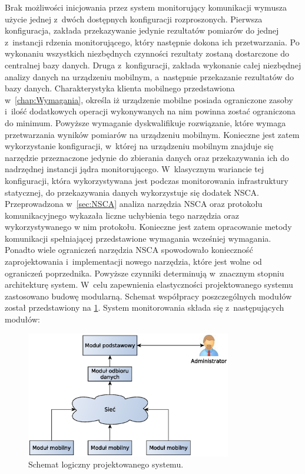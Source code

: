 Brak możliwości inicjowania przez system monitorujący komunikacji
wymusza użycie jednej z~dwóch dostępnych konfiguracji
rozproszonych. Pierwsza konfiguracja, zakłada przekazywanie jedynie
rezultatów pomiarów do jednej z~instancji rdzenia monitorującego,
który następnie dokona ich przetwarzania. Po wykonaniu wszystkich
niezbędnych czynności rezultaty zostaną dostarczone do centralnej bazy
danych. Druga z~konfiguracji, zakłada wykonanie całej niezbędnej
analizy danych na urządzeniu mobilnym, a~następnie przekazanie
rezultatów do bazy danych. Charakterystyka klienta mobilnego
przedstawiona w~\ref{chap:Wymagania}, określa iż urządzenie mobilne
posiada ograniczone zasoby i~ilość dodatkowych operacji wykonywanych
na nim powinna zostać ograniczona do minimum. Powyższe wymaganie
dyskwalifikuje rozwiązanie, które wymaga przetwarzania wyników
pomiarów na urządzeniu mobilnym. Konieczne jest zatem wykorzystanie
konfiguracji, w~której na urządzeniu mobilnym znajduje się narzędzie
przeznaczone jedynie do zbierania danych oraz przekazywania ich do
nadrzędnej instancji jądra monitorującego. W~klasycznym wariancie tej
konfiguracji, która wykorzystywana jest podczas monitorowania
infrastruktury statycznej, do przekazywania danych wykorzystuje się
dodatek NSCA. Przeprowadzona w~\ref{sec:NSCA} analiza narzędzia NSCA
oraz protokołu komunikacyjnego wykazała liczne uchybienia tego
narzędzia oraz wykorzystywanego w nim protokołu. Konieczne jest zatem
opracowanie metody komunikacji spełniającej przedstawione wymagania
wcześniej wymagania. Ponadto wiele ograniczeń narzędzia NSCA
spowodowało konieczność zaprojektowania i~implementacji nowego
narzędzia, które jest wolne od ograniczeń poprzednika. Powyższe
czynniki determinują w~znacznym stopniu architekturę system. W~celu
zapewnienia elastyczności projektowanego systemu zastosowano budowę
modularną. Schemat współpracy poszczególnych modułów został
przedstawiony na \ref{fig:archCalosci}. System monitorowania składa się
z~następujących modułów:

\begin{figure}[h]
  \caption{Schemat logiczny projektowanego systemu.}
  \label{fig:archCalosci}
  \centering
\includegraphics[width=0.8\textwidth]{img/archCalosci}
\end{figure}

